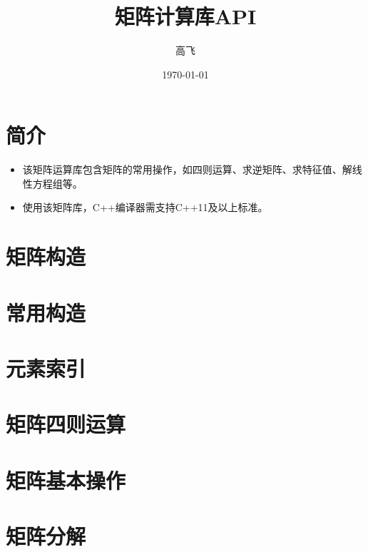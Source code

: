 \documentclass[UTF8]{ctexart}
\title{矩阵计算库API}
\author{高飞}
\date{\today}
\begin{document}
\large
\maketitle
\tableofcontents
\newpage

\section{简介}

\begin{itemize}
    \item 该矩阵运算库包含矩阵的常用操作，如四则运算、求逆矩阵、求特征值、解线性方程组等。
    \item 使用该矩阵库，C++编译器需支持C++11及以上标准。
\end{itemize}

\section{矩阵构造}

\section{常用构造}

\section{元素索引}

\section{矩阵四则运算}

\section{矩阵基本操作}

\section{矩阵分解}
\end{document}
